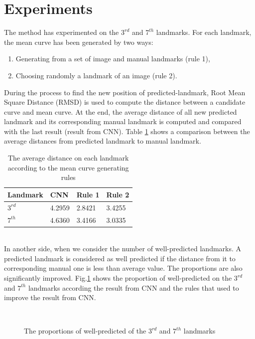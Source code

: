 \documentclass[12pt,a4paper]{article}
\begin{document}
\section{Experiments}
The method has experimented on the $3^{rd}$ and $7^{th}$ landmarks. For each landmark, the mean curve has been generated by two ways:
\begin{enumerate}
	\item Generating from a set of image and manual landmarks (rule 1),
	\item Choosing randomly a landmark of an image (rule 2).
\end{enumerate}
During the process to find the new position of predicted-landmark, Root Mean Square Distance (RMSD) is used to compute the distance between a candidate curve and mean curve. At the end, the average distance of all new predicted landmark and its corresponding manual landmark is computed and compared with the last result (result from CNN). Table \ref{avgdistance2} shows a comparison between the average distances from predicted landmark to manual landmark.
\begin{table}[h!]
	\centering
	\begin{tabular}{l l l l }
	 Landmark & CNN & Rule 1 & Rule 2 \\ \hline
 	 $3^{rd}$ & 4.2959 & 2.8421 & 3.4255 \\ \hline
 	 $7^{th}$ & 4.6360 &	3.4166 & 3.0335 \\ \hline
	\end{tabular}
	\caption{The average distance on each landmark according to the mean curve generating rules}
	\label{avgdistance2}
\end{table}~\\
In another side, when we consider the number of well-predicted landmarks. A predicted landmark is considered as well predicted if the distance from it to corresponding manual one is less than average value. The proportions are also significantly improved. Fig.\ref{propotions} shows the proportion of well-predicted on the $3^{rd}$ and $7^{th}$ landmarks according the result from CNN and the rules that used to improve the result from CNN.
\begin{figure}[h!]
\centering
{}~~
\caption{The proportions of well-predicted of the $3^{rd}$ and $7^{th}$ landmarks}
\label{propotions}
\end{figure}~\\
\end{document}
